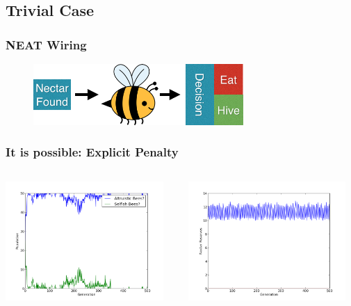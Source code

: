 \documentclass{beamer}
\begin{document}
        

    \subsection{Trivial Case} %
    \label{sub:trivial_case}
    
        \begin{frame}[c]\frametitle{NEAT Wiring}
          \begin{figure}
          \includegraphics[width=8cm]{bee_diagrams/naive_sysem.png}
          \end{figure}
        \end{frame}
          \begin{frame}[cr]\frametitle{It is possible: Explicit Penalty}

        \begin{columns}
          \begin{column}{0.48\textwidth}
          \includegraphics[width=6cm]{results/trivial_solution.png}
            
          \end{column}
          \begin{column}{0.48\textwidth}
            
          \includegraphics[width=6cm]{results/trivial_solution_nectar.png}
          \end{column}
        \end{columns}
      \end{frame}
\end{document}
